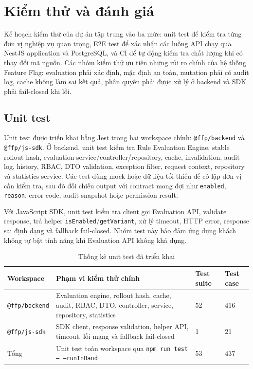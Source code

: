 \section{Kiểm thử và đánh giá}

Kế hoạch kiểm thử của dự án tập trung vào ba mức: unit test để kiểm tra từng đơn vị nghiệp vụ quan trọng, E2E test để xác nhận các luồng API chạy qua NestJS application và PostgreSQL, và CI để tự động kiểm tra chất lượng khi có thay đổi mã nguồn. Các nhóm kiểm thử ưu tiên những rủi ro chính của hệ thống Feature Flag: evaluation phải xác định, mặc định an toàn, mutation phải có audit log, cache không làm sai kết quả, phân quyền phải được xử lý ở backend và SDK phải fail-closed khi lỗi.

\subsection{Unit test}

Unit test được triển khai bằng Jest trong hai workspace chính: \texttt{@ffp/backend} và \texttt{@ffp/js-sdk}. Ở backend, unit test kiểm tra Rule Evaluation Engine, stable rollout hash, evaluation service/controller/repository, cache, invalidation, audit log, history, RBAC, DTO validation, exception filter, request context, repository và statistics service. Các test dùng mock hoặc dữ liệu tối thiểu để cô lập đơn vị cần kiểm tra, sau đó đối chiếu output với contract mong đợi như \texttt{enabled}, \texttt{reason}, error code, audit snapshot hoặc permission result.

Với JavaScript SDK, unit test kiểm tra client gọi Evaluation API, validate response, trả helper \texttt{isEnabled}/\texttt{getVariant}, xử lý timeout, HTTP error, response sai định dạng và fallback fail-closed. Nhóm test này bảo đảm ứng dụng khách không tự bật tính năng khi Evaluation API không khả dụng.

\begin{table}[H]
    \centering
    \small
    \caption{Thống kê unit test đã triển khai}
    \label{tab:unit-test-summary}
    \begin{tabular}{p{} p{} p{} p{}}
        \toprule
        \textbf{Workspace} & \textbf{Phạm vi kiểm thử chính} & \textbf{Test suite} & \textbf{Test case} \\
        \midrule
        \texttt{@ffp/backend} & Evaluation engine, rollout hash, cache, audit, RBAC, DTO, controller, service, repository, statistics & 52 & 416 \\
        \texttt{@ffp/js-sdk} & SDK client, response validation, helper API, timeout, lỗi mạng và fallback fail-closed & 1 & 21 \\
        Tổng & Unit test toàn workspace qua \texttt{npm run test -- --runInBand} & 53 & 437 \\
        \bottomrule
    \end{tabular}
\end{table}

